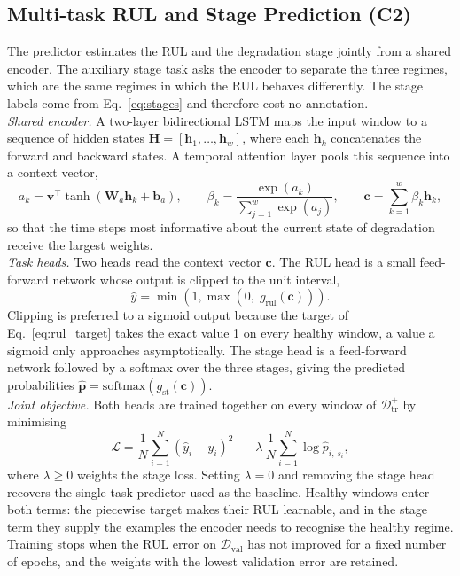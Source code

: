 \documentclass[review]{elsarticle}
\begin{document}
\subsection{Multi-task RUL and Stage Prediction (C2)}
\label{sec:c2_multitask}

The predictor estimates the RUL and the degradation stage jointly from
a shared encoder. The auxiliary stage task asks the encoder to
separate the three regimes, which are the same regimes in which the
RUL behaves differently. The stage labels come from
Eq.~\eqref{eq:stages} and therefore cost no annotation.\\

\textit{Shared encoder.} A two-layer bidirectional LSTM maps the input
window to a sequence of hidden states
$\mathbf{H} = [\mathbf{h}_1, \dots, \mathbf{h}_w]$, where each
$\mathbf{h}_k$ concatenates the forward and backward states. A temporal
attention layer pools this sequence into a context vector,
\begin{equation}
  a_k = \mathbf{v}^{\top} \tanh\left( \mathbf{W}_a \mathbf{h}_k +
  \mathbf{b}_a \right), \qquad
  \beta_k = \frac{\exp(a_k)}{\sum_{j=1}^{w} \exp(a_j)}, \qquad
  \mathbf{c} = \sum_{k=1}^{w} \beta_k \mathbf{h}_k ,
  \label{eq:attention}
\end{equation}
so that the time steps most informative about the current state of
degradation receive the largest weights.\\

\textit{Task heads.} Two heads read the context vector $\mathbf{c}$.
The RUL head is a small feed-forward network whose output is clipped to
the unit interval,
\begin{equation}
  \hat{y} = \min\left( 1, \max\left( 0, \; g_{\mathrm{rul}}(\mathbf{c})
  \right) \right).
  \label{eq:rul_head}
\end{equation}
Clipping is preferred to a sigmoid output because the target of
Eq.~\eqref{eq:rul_target} takes the exact value 1 on every healthy
window, a value a sigmoid only approaches asymptotically. The stage
head is a feed-forward network followed by a softmax over the three
stages, giving the predicted probabilities
$\hat{\mathbf{p}} = \mathrm{softmax}(g_{\mathrm{st}}(\mathbf{c}))$.\\

\textit{Joint objective.} Both heads are trained together on every
window of $\mathcal{D}_{\mathrm{tr}}^{+}$ by minimising
\begin{equation}
  \mathcal{L} = \frac{1}{N} \sum_{i=1}^{N} \left( \hat{y}_i - y_i
  \right)^2
  \;-\; \lambda \, \frac{1}{N} \sum_{i=1}^{N} \log \hat{p}_{i,\,s_i},
  \label{eq:mt_loss}
\end{equation}
where $\lambda \geq 0$ weights the stage loss. Setting $\lambda = 0$
and removing the stage head recovers the single-task predictor used as
the baseline. Healthy windows enter both terms: the piecewise target
makes their RUL learnable, and in the stage term they supply the
examples the encoder needs to recognise the healthy regime. Training
stops when the RUL error on $\mathcal{D}_{\mathrm{val}}$ has not
improved for a fixed number of epochs, and the weights with the lowest
validation error are retained.
\end{document}
